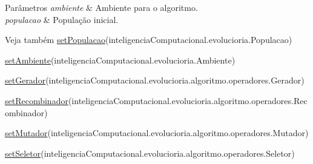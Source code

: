 \begin{DoxyParams}{Parâmetros}
{\em ambiente} & Ambiente para o algoritmo. \\
\hline
{\em populacao} & População inicial.\\
\hline
\end{DoxyParams}
\begin{DoxySeeAlso}{Veja também}
\hyperlink{classic_1_1populacional_1_1algoritmo_1_1_algoritmo_evolucionario_3_01_gextends_01_number_01_6_co1efdb05fe19a950b8d1e9e15f7d06254_aaf17db98cce445b6f757b9c37810327a}{set\-Populacao}(inteligencia\-Computacional.\-evolucioria.\-Populacao) 

\hyperlink{classic_1_1populacional_1_1algoritmo_1_1_algoritmo_evolucionario_3_01_gextends_01_number_01_6_co1efdb05fe19a950b8d1e9e15f7d06254_a68db18fec4322f9ec81e1b958162b655}{set\-Ambiente}(inteligencia\-Computacional.\-evolucioria.\-Ambiente) 

\hyperlink{classic_1_1populacional_1_1algoritmo_1_1_algoritmo_evolucionario_3_01_gextends_01_number_01_6_co1efdb05fe19a950b8d1e9e15f7d06254_ad98dea12ac5aa49c3aedd64731277590}{set\-Gerador}(inteligencia\-Computacional.\-evolucioria.\-algoritmo.\-operadores.\-Gerador) 

\hyperlink{classic_1_1populacional_1_1algoritmo_1_1_algoritmo_evolucionario_3_01_gextends_01_number_01_6_co1efdb05fe19a950b8d1e9e15f7d06254_ae2ec6e66337c0c1075767f9222ecaa20}{set\-Recombinador}(inteligencia\-Computacional.\-evolucioria.\-algoritmo.\-operadores.\-Recombinador) 

\hyperlink{classic_1_1populacional_1_1algoritmo_1_1_algoritmo_evolucionario_3_01_gextends_01_number_01_6_co1efdb05fe19a950b8d1e9e15f7d06254_aa29043d9ec8f15f5c12146ef87f74e75}{set\-Mutador}(inteligencia\-Computacional.\-evolucioria.\-algoritmo.\-operadores.\-Mutador) 

\hyperlink{classic_1_1populacional_1_1algoritmo_1_1_algoritmo_evolucionario_3_01_gextends_01_number_01_6_co1efdb05fe19a950b8d1e9e15f7d06254_a359a39d12caae7697213b535e4c60b74}{set\-Seletor}(inteligencia\-Computacional.\-evolucioria.\-algoritmo.\-operadores.\-Seletor) 
\end{DoxySeeAlso}


